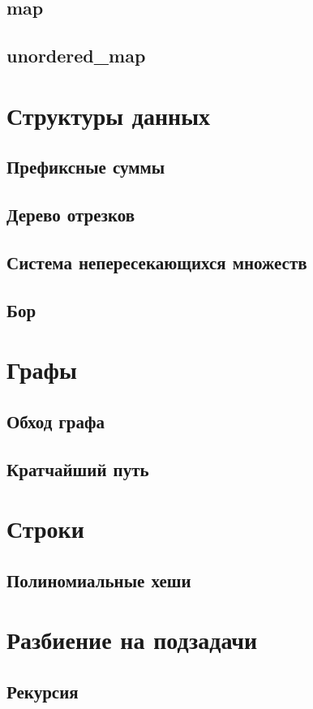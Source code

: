 \documentclass[a4paper,8pt]{article}
\begin{document}
    \subsection{map}
    \subsection{unordered\_map}
\section{Структуры данных}
    \subsection{Префиксные суммы}
    \subsection{Дерево отрезков}
    \subsection{Система непересекающихся множеств}
    \subsection{Бор}
\section{Графы}
    \subsection{Обход графа}
    \subsection{Кратчайший путь}
\section{Строки}
    \subsection{Полиномиальные хеши}
\section{Разбиение на подзадачи}
    \subsection{Рекурсия}
\end{document}
